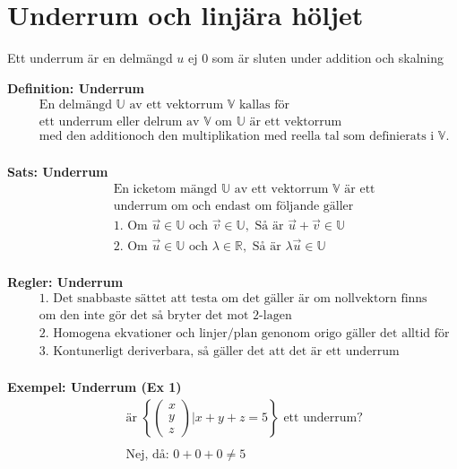 \newpage

\section{Underrum och linjära höljet}
Ett underrum är en delmängd $u$ ej $0$ som är sluten under addition och skalning

\textbf{Definition: Underrum}
\begin{align*}
  &\quad  \text{En delmängd $\mathbb{U}$ av ett vektorrum $\mathbb{V}$ kallas för } \\
  &\quad  \text{ett underrum eller delrum av $\mathbb{V}$ om $\mathbb{U}$ är ett vektorrum} \\
  &\quad  \text{med den additionoch den multiplikation med reella tal som definierats i
    $\mathbb{V}$.} \\
\end{align*}

\textbf{Sats: Underrum}
\begin{align*}
  &\quad  \text{En icketom mängd $\mathbb{U}$ av ett vektorrum $\mathbb{V}$ är ett} \\
  &\quad  \text{underrum om och endast om följande gäller} \\
  &\quad  \text{1. Om } \vec{u}\in\mathbb{U} \text{ och } \vec{v}\in\mathbb{U},
  \text{ Så är } \vec{u}+\vec{v} \in\mathbb{U} \\
  &\quad  \text{2. Om } \vec{u}\in\mathbb{U} \text{ och } \lambda\in\mathbb{R},
  \text{ Så är } \lambda\vec{u} \in\mathbb{U} \\
\end{align*}

\textbf{Regler: Underrum}
\begin{align*}
  &\quad  \text{1. Det snabbaste sättet att testa om det gäller är om nollvektorn finns} \\
  &\quad  \text{om den inte gör det så bryter det mot 2-lagen} \\
  &\quad  \text{2. Homogena ekvationer och linjer/plan genonom origo gäller det alltid för} \\
  &\quad  \text{3. Kontunerligt deriverbara, så gäller det att det är ett underrum} \\
\end{align*}

\textbf{Exempel: Underrum (Ex 1)}
\begin{align*}
  &\quad  \text{är } \left\{ \begin{pmatrix} x \\ y \\ z \end{pmatrix} | x+y+z=5 \right\}
  \text{ ett underrum?} \\
  &\quad  \\
  &\quad  \text{Nej, då: } 0+0+0\neq5 \\
\end{align*} %


